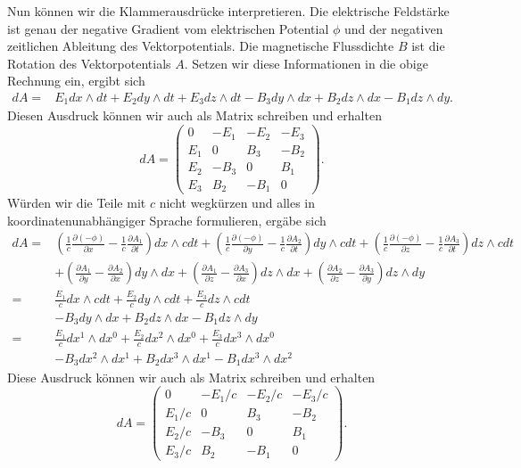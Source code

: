Nun können wir die Klammerausdrücke interpretieren.
Die elektrische Feldstärke ist genau der negative Gradient vom elektrischen Potential $\phi$ und der negativen zeitlichen Ableitung des Vektorpotentials.
Die magnetische Flussdichte $B$ ist die Rotation des Vektorpotentials $A$.
Setzen wir diese Informationen in die obige Rechnung ein, ergibt sich
\begin{align*}
	dA = 
	& E_1 dx \wedge dt + E_2 dy\wedge dt + E_3 dz\wedge dt - B_3 dy \wedge dx + B_2 dz \wedge dx - B_1 dz\wedge dy.
\end{align*}
Diesen Ausdruck können wir auch als Matrix schreiben und erhalten
\begin{equation*}
	dA = \begin{pmatrix}
		0 & -E_1 & -E_2 & -E_3 \\ E_1 & 0 & B_3 & -B_2 \\ E_2 & -B_3 & 0 & B_1 \\ E_3 & B_2 & -B_1 & 0 
	\end{pmatrix}.
\end{equation*}
Würden wir die Teile mit $c$ nicht wegkürzen und alles in koordinatenunabhängiger Sprache formulieren, ergäbe sich
\begin{align*}
	dA = 
	& \left(\frac{1}{c}\frac{\partial (-\phi)}{\partial x}-\frac{1}{c}\frac{\partial A_1}{\partial t}\right) dx \wedge cdt +
	\left(\frac{1}{c}\frac{\partial (-\phi)}{\partial y}-\frac{1}{c}\frac{\partial A_2}{\partial t}\right) dy \wedge cdt +
	\left(\frac{1}{c}\frac{\partial (-\phi)}{\partial z}-\frac{1}{c}\frac{\partial A_3}{\partial t}\right) dz \wedge cdt\\
	& + \left(\frac{\partial A_1}{\partial y}-\frac{\partial A_2}{\partial x}\right) dy \wedge dx +
	\left(\frac{\partial A_1}{\partial z}-\frac{\partial A_3}{\partial x}\right) dz \wedge dx +
	\left(\frac{\partial A_2}{\partial z}-\frac{\partial A_3}{\partial y}\right) dz \wedge dy\\[2ex] = 
	& \frac{E_1}{c} dx \wedge cdt +
	\frac{E_2}{c} dy \wedge cdt +
	\frac{E_3}{c} dz \wedge cdt\\
	& - B_3 dy \wedge dx +
	B_2 dz \wedge dx -
	B_1 dz \wedge dy\\[2ex] =
	& \frac{E_1}{c} dx^1 \wedge dx^0 +
	\frac{E_2}{c} dx^2 \wedge dx^0 +
	\frac{E_3}{c} dx^3 \wedge dx^0\\
	& - B_3 dx^2 \wedge dx^1 +
	B_2 dx^3 \wedge dx^1 -
	B_1 dx^3 \wedge dx^2
\end{align*}
Diese Ausdruck können wir auch als Matrix schreiben und erhalten
\begin{equation*}
	dA = \begin{pmatrix}
		0 & -E_1/c & -E_2/c & -E_3/c \\ E_1/c & 0 & B_3 & -B_2 \\ E_2/c & -B_3 & 0 & B_1 \\ E_3/c & B_2 & -B_1 & 0 
	\end{pmatrix}.
\end{equation*}
